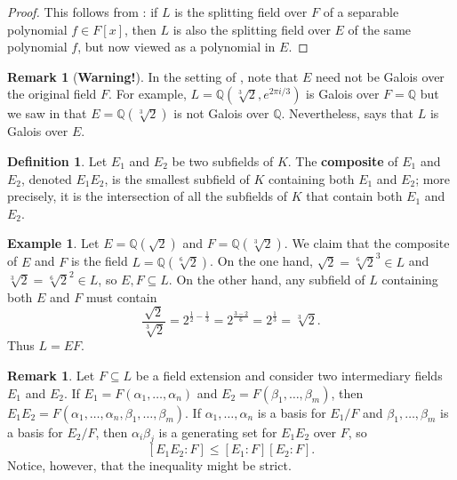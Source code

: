 \documentclass[12pt]{report}
\numberwithin{equation}{section}
\numberwithin{theorem}{chapter}
\theoremstyle{definition}
\newtheorem{definition}[theorem]{Definition}
\newtheorem{example}[theorem]{Example}
\newtheorem*{basic properties}{Basic Properties}
\newtheorem*{Important Remark}{Important Remark}
\newtheorem{remark}[theorem]{Remark}
\begin{document}
\begin{proof} 
This follows from : if $L$ is the splitting field over $F$ of a separable polynomial $f \in F[x]$, then $L$ is also the splitting field over $E$ of the same polynomial $f$, but now viewed as a polynomial in $E$.
\end{proof}



\begin{remark}[\bf Warning!] 
In the setting of , note that $E$ need not be Galois over the original field $F$. For example, $L = \mathbb{Q}(\sqrt[3]{2}, e^{2 \pi i/3})$ is Galois over $F = \mathbb{Q}$ but we saw in  that $E = \mathbb{Q}(\sqrt[3]{2})$ is not Galois over $\mathbb{Q}$. Nevertheless,  says that $L$ is Galois over $E$.
\end{remark}


\begin{definition}
	Let $E_1$ and $E_2$ be two subfields of $K$. The {\bf composite} of $E_1$ and $E_2$, denoted $E_1 E_2$, is the smallest subfield of $K$ containing both $E_1$ and $E_2$; more precisely, it is the intersection of all the subfields of $K$ that contain both $E_1$ and $E_2$.
\end{definition}


\begin{example}
	Let $E = \mathbb{Q}(\sqrt{2})$ and $F = \mathbb{Q}(\sqrt[3]{2})$. We claim that the composite of $E$ and $F$ is the field $L = \mathbb{Q}(\sqrt[6]{2})$. On the one hand, $\sqrt{2} = \sqrt[6]{2}^3 \in L$ and $\sqrt[3]{2} = \sqrt[6]{2}^2 \in L$, so $E, F \subseteq L$. On the other hand, any subfield of $L$ containing both $E$ and $F$ must contain
	$$\frac{\sqrt{2}}{\sqrt[3]{2}} = 2^{\frac{1}{2} - \frac{1}{3}} = 2^{\frac{3-2}{6}} = 2^{\frac{1}{3}} = \sqrt[3]{2}.$$
	Thus $L = EF$.
\end{example}


\begin{remark}
	Let $F \subseteq L$ be a field extension and consider two intermediary fields $E_1$ and $E_2$. If $E_1 = F(\alpha_1, \ldots, \alpha_n)$ and $E_2 = F(\beta_1, \ldots, \beta_m)$, then $E_1 E_2 = F(\alpha_1, \ldots, \alpha_n, \beta_1, \ldots, \beta_m)$. If $\alpha_1, \ldots, \alpha_n$ is a basis for $E_1/F$ and  $\beta_1, \ldots, \beta_m$ is a basis for $E_2/F$, then $\alpha_i \beta_j$ is a generating set for $E_1E_2$ over $F$, so
	$$[E_1 E_2 : F] \leqslant [E_1 : F][E_2 : F].$$
	Notice, however, that the inequality might be strict.
\end{remark}
\end{document}
